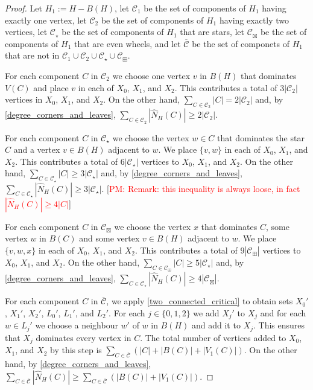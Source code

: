 \documentclass[12pt]{article}
\theoremstyle{definition}
\newcommand{\pat}[1]{[\textcolor{red}{PM: #1}]}
\begin{document}
\begin{proof}
  Let $H_1:=H-B(H)$, let $\mathcal{C}_1$ be the set of components of $H_1$ having exactly one vertex, let $\mathcal{C}_2$ be the set of components of $H_1$ having exactly two vertices, let $\mathcal{C}_\star$ be the set of components of $H_1$ that are stars, let $\mathcal{C}_{\boxtimes}$ be the set of components of $H_1$ that are even wheels, and let $\overline{\mathcal{C}}$ be the set of componets of $H_1$ that are not in $\mathcal{C}_1\cup \mathcal{C}_2\cup \mathcal{C}_{\star}\cup \mathcal{C}_{\boxplus}$.


  For each component $C$ in $\mathcal{C}_2$ we choose one vertex $v$ in $B(H)$ that dominates $V(C)$ and place $v$ in each of $X_0$, $X_1$, and $X_2$. This contributes a total of $3|\mathcal{C}_2|$ vertices in $X_0$, $X_1$, and $X_2$. On the other hand, $\sum_{C\in \mathcal{C}_2} |C|=2|\mathcal{C}_2|$ and, by \cref{degree_corners_and_leaves},  $\sum_{C\in \mathcal{C}_2} |\widehat{N}_H(C)|\ge 2|\mathcal{C}_2|$.

  For each component $C$ in $\mathcal{C}_{\star}$ we choose the vertex $w\in C$ that dominates the star $C$ and a vertex $v\in B(H)$ adjacent to $w$.  We place $\{v,w\}$ in each of $X_0$, $X_1$, and $X_2$.  This contributes a total of $6|\mathcal{C}_{\star}|$ vertices to $X_0$, $X_1$, and $X_2$.  On the other hand, $\sum_{C\in \mathcal{C}_{\star}} |C|\ge 3|\mathcal{C}_{\star}|$ and, by \cref{degree_corners_and_leaves}, $\sum_{C\in \mathcal{C}_{\star}} |\widehat{N}_H(C)|\ge 3|\mathcal{C}_\star|$. \pat{Remark: this inequality is always loose, in fact $|\widehat{N}_H(C)|\ge 4|C|$}

  For each component $C$ in $\mathcal{C}_{\boxtimes}$ we choose the vertex $x$ that dominates $C$, some vertex $w$ in $B(C)$ and some vertex $v\in B(H)$ adjacent to $w$.  We place $\{v,w,x\}$ in each of $X_0$, $X_1$, and $X_2$.  This contributes a total of $9|\mathcal{C}_{\boxplus}|$ vertices to $X_0$, $X_1$, and $X_2$. On the other hand, $\sum_{C\in \mathcal{C}_{\boxplus}} |C|\ge 5|\mathcal{C}_{\star}|$ and, by \cref{degree_corners_and_leaves}, $\sum_{C\in \mathcal{C}_{\star}} |\widehat{N}_H(C)|\ge 4|\mathcal{C}_{\boxtimes}|$.

  For each component $C$ in $\overline{\mathcal{C}}$, we apply \cref{two_connected_critical} to obtain sets $X_0'$, $X_1'$, $X_2'$, $L_0'$, $L_1'$, and $L_2'$.
  For each $j\in\{0,1,2\}$ we add $X_j'$ to $X_j$ and for each $w\in L_j'$ we choose a neighbour $w'$ of $w$ in $B(H)$ and add it to $X_j$.  This ensures that $X_j$ dominates every vertex in $C$.  The total number of vertices added to $X_0$, $X_1$, and $X_2$ by this step is $\sum_{C\in\overline{\mathcal{C}}}(|C|+|B(C)|+|V_1(C)|)$.  On the other hand, by \cref{degree_corners_and_leaves}, $\sum_{C\in \overline{\mathcal{C}}} |\widehat{N}_H(C)|\ge \sum_{C\in \overline{\mathcal{C}}} (|B(C)|+|V_1(C)|)$.


\end{proof}
\end{document}
